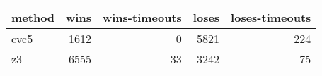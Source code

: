\begin{tabular}{lrrrr}
\hline
 method   &   wins &   wins-timeouts &   loses &   loses-timeouts \\
\hline
 cvc5     &   1612 &               0 &    5821 &              224 \\
 z3       &   6555 &              33 &    3242 &               75 \\
\hline
\end{tabular}
